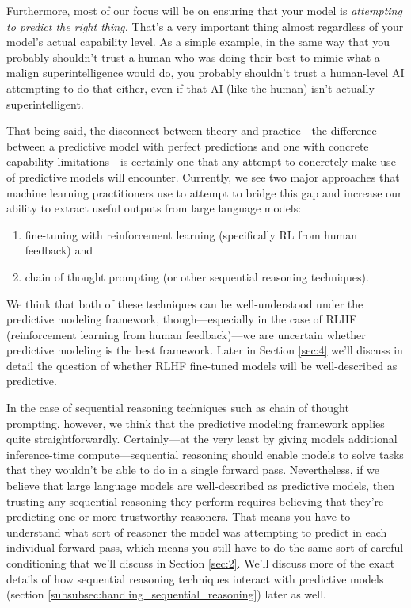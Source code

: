 \documentclass[
  onecolumn,
  natbib,
]{miri-tech-article}
\begin{document}
Furthermore, most of our focus will be on ensuring that your model is \textit{attempting to predict the right thing.} That's a very important thing almost regardless of your model's actual capability level. As a simple example, in the same way that you probably shouldn't trust a human who was doing their best to mimic what a malign superintelligence would do, you probably shouldn't trust a human-level AI attempting to do that either, even if that AI (like the human) isn't actually superintelligent.

That being said, the disconnect between theory and practice---the difference between a predictive model with perfect predictions and one with concrete capability limitations---is certainly one that any attempt to concretely make use of predictive models will encounter. Currently, we see two major approaches that machine learning practitioners use to attempt to bridge this gap and increase our ability to extract useful outputs from large language models:



\begin{enumerate}
\item fine-tuning with reinforcement learning\cite{deep_RL_human_pref} (specifically RL from human feedback) and
\item chain of thought prompting\cite{chain_of_thought} (or other sequential reasoning techniques).
\end{enumerate}

We think that both of these techniques can be well-understood under the predictive modeling framework, though---especially in the case of RLHF (reinforcement learning from human feedback)---we are uncertain whether predictive modeling is the best framework. Later in Section \ref{sec:4} we'll discuss in detail the question of whether RLHF fine-tuned models will be well-described as predictive.

In the case of sequential reasoning techniques such as chain of thought prompting, however, we think that the predictive modeling framework applies quite straightforwardly. Certainly---at the very least by giving models additional inference-time compute---sequential reasoning should enable models to solve tasks that they wouldn't be able to do in a single forward pass. Nevertheless, if we believe that large language models are well-described as predictive models, then trusting any sequential reasoning they perform requires believing that they're predicting one or more trustworthy reasoners. That means you have to understand what sort of reasoner the model was attempting to predict in each individual forward pass, which means you still have to do the same sort of careful conditioning that we'll discuss in Section \ref{sec:2}. We'll discuss more of the exact details of how sequential reasoning techniques interact with predictive models (section \ref{subsubsec:handling_sequential_reasoning}) later as well.
\end{document}
